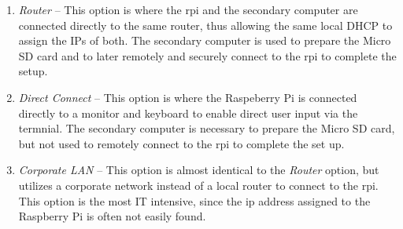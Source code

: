 \documentclass[12pt]{article}
\begin{document}
\vspace{0.5 cm}
\begin{enumerate}
  \item {\em Router} -- This option is where the \gls{rpi} and the
  secondary computer are connected directly to the same router, thus
  allowing the same local DHCP to assign the IPs of both.  The
  secondary computer is used to prepare the Micro SD card and to later
  remotely and securely connect to the \gls{rpi} to complete the
  setup.
  
  \item {\em Direct Connect} -- This option is where the Raspeberry Pi
  is connected directly to a monitor and keyboard to enable direct
  user input via the termnial.  The secondary computer is necessary to
  prepare the Micro SD card, but not used to remotely connect to the
  \gls{rpi} to complete the set up.

  \item {\em Corporate LAN} -- This option is almost identical to the
  {\em Router} option, but utilizes a corporate network instead of
  a local router to connect to the \gls{rpi}.  This option is the
  most IT intensive, since the \gls{ip} address assigned to the Raspberry
  Pi is often not easily found.
\end{enumerate}
\vspace{0.5 cm}
\end{document}
